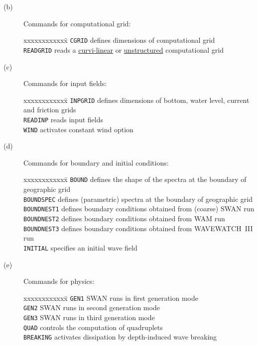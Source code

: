 \documentclass[12pt]{book}
\begin{document}
\begin{description}
  \item[(b)] Commands for computational grid:
\begin{tabbing}
xxxxxxxxxxxx\= \kill
{\tt CGRID}    \> defines dimensions of computational grid\\
{\tt READGRID} \> reads a \underline{curvi-linear} or \underline{unstructured} computational grid\\
\end{tabbing}
  \item[(c)] Commands for input fields:
\begin{tabbing}
xxxxxxxxxxxx\= \kill
{\tt INPGRID} \> defines dimensions of bottom, water level, current and friction grids\\
{\tt READINP} \> reads input fields\\
{\tt WIND}    \> activates constant wind option\\
\end{tabbing}
  \item[(d)] Commands for boundary and initial conditions:
\begin{tabbing}
xxxxxxxxxxxx\= \kill
{\tt BOUND}      \> defines the shape of the spectra at the boundary of geographic grid\\
{\tt BOUNDSPEC}  \> defines (parametric) spectra at the boundary of geographic grid\\
{\tt BOUNDNEST1} \> defines boundary conditions obtained from (coarse) SWAN run\\
{\tt BOUNDNEST2} \> defines boundary conditions obtained from WAM run\\
{\tt BOUNDNEST3} \> defines boundary conditions obtained from WAVEWATCH~III run\\
{\tt INITIAL}    \> specifies an initial wave field\\
\end{tabbing}
  \item[(e)] Commands for physics:
\begin{tabbing}
xxxxxxxxxxxx\= \kill
{\tt GEN1}     \> SWAN runs in first generation mode\\
{\tt GEN2}     \> SWAN runs in second generation mode\\
{\tt GEN3}     \> SWAN runs in third generation mode\\
{\tt QUAD}     \> controls the computation of quadruplets\\
{\tt BREAKING} \> activates dissipation by depth-induced wave breaking\\

\end{tabbing}
\end{description}
\end{document}
